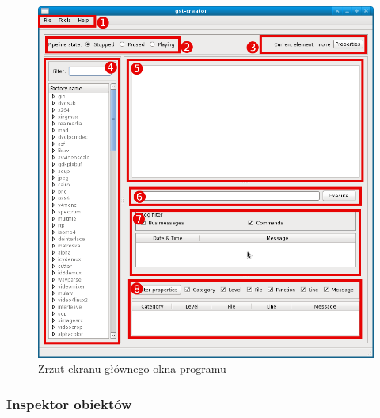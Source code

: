 \documentclass[12pt]{article}
\begin{document}
\begin{figure}[H]
  \includegraphics[width=160mm]{img/main-window.png}
  \caption{Zrzut ekranu głównego okna programu}
  \label{fig:mainWindow}
\end{figure}
\subsubsection{Inspektor obiektów}
\end{document}

